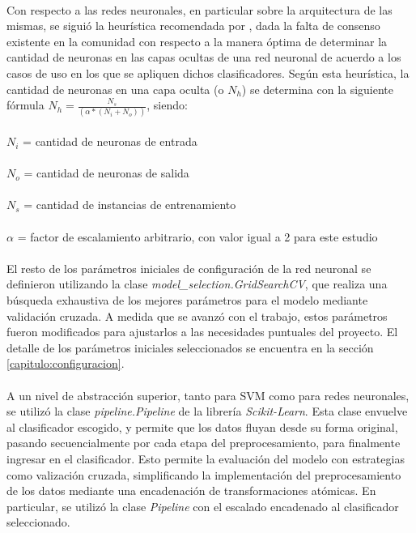 \paragraph{} Con respecto a las redes neuronales, en particular sobre la arquitectura de las mismas, se siguió la heurística recomendada por \citet{bib-heuristic-hobs}, dada la falta de consenso existente en la comunidad con respecto a la manera óptima de determinar la cantidad de neuronas en las capas ocultas de una red neuronal de acuerdo a los casos de uso en los que se apliquen dichos clasificadores.
Según esta heurística, la cantidad de neuronas en una capa oculta (o $N_h$) se determina con la siguiente fórmula $N_h = \frac{N_s} {(\alpha * (N_i + N_o))}$, siendo:
\\
\\
$N_i$ = cantidad de neuronas de entrada
\\
\\
$N_o$ = cantidad de neuronas de salida
\\
\\
$N_s$ = cantidad de instancias de entrenamiento
\\
\\
$\alpha$ = factor de escalamiento arbitrario, con valor igual a 2 para este estudio

\paragraph{} El resto de los parámetros iniciales de configuración de la red neuronal se definieron utilizando la clase \textit{model\_selection.GridSearchCV}, que realiza una búsqueda exhaustiva de los mejores parámetros para el modelo mediante validación cruzada.
A medida que se avanzó con el trabajo, estos parámetros fueron modificados para ajustarlos a las necesidades puntuales del proyecto.
El detalle de los parámetros iniciales seleccionados se encuentra en la sección \ref{capitulo:configuracion}.

\paragraph{} A un nivel de abstracción superior, tanto para SVM como para redes neuronales, se utilizó la clase \textit{pipeline.Pipeline}\cite{Pipeline-scikit-learn} de la librería \textit{Scikit-Learn}.
Esta clase envuelve al clasificador escogido, y permite que los datos fluyan desde su forma original, pasando secuencialmente por cada etapa del preprocesamiento, para finalmente ingresar en el clasificador.
Esto permite la evaluación del modelo con estrategias como valización cruzada, simplificando la implementación del preprocesamiento de los datos mediante una encadenación de transformaciones atómicas.
En particular, se utilizó la clase \textit{Pipeline} con el escalado encadenado al clasificador seleccionado. 

